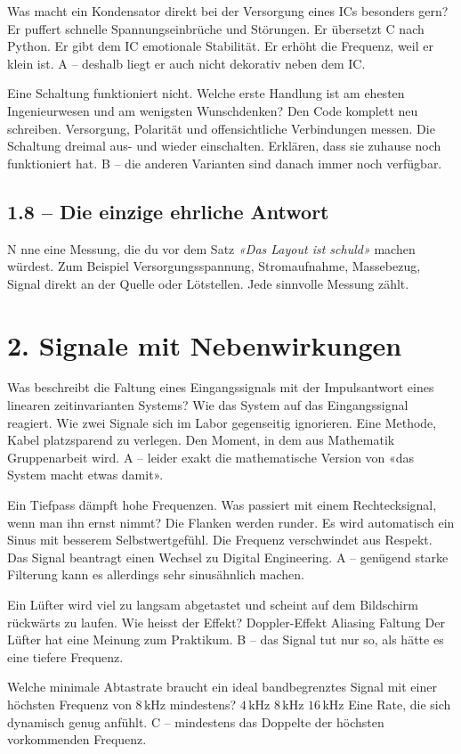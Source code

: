 \documentclass[a4paper,11pt]{article}
\newif\ifloesung
\newcommand{\loesung}[1]{%
  \ifloesung\par\smallskip{\color{zwetschge}\textit{Lösung: #1}}\par\medskip\fi}
\newcommand{\offenfrage}[3]{%
  \subsection*{#1}
  #2
  \loesung{#3}}
\newcommand{\runde}[1]{\newpage\section*{#1}\addcontentsline{toc}{section}{#1}}
\begin{document}
Was macht ein Kondensator direkt bei der Versorgung eines ICs besonders
gern?
{Er puffert schnelle Spannungseinbrüche und Störungen.}
{Er übersetzt C nach Python.}
{Er gibt dem IC emotionale Stabilität.}
{Er erhöht die Frequenz, weil er klein ist.}
{A -- deshalb liegt er auch nicht dekorativ neben dem IC.}

Eine Schaltung funktioniert nicht. Welche erste Handlung ist am ehesten
Ingenieurwesen und am wenigsten Wunschdenken?
{Den Code komplett neu schreiben.}
{Versorgung, Polarität und offensichtliche Verbindungen messen.}
{Die Schaltung dreimal aus- und wieder einschalten.}
{Erklären, dass sie zuhause noch funktioniert hat.}
{B -- die anderen Varianten sind danach immer noch verfügbar.}

\offenfrage{1.8 -- Die einzige ehrliche Antwort}
Nenne eine Messung, die du vor dem Satz \textit{«Das Layout ist schuld»}
machen würdest.
{Zum Beispiel Versorgungsspannung, Stromaufnahme, Massebezug, Signal direkt
an der Quelle oder Lötstellen. Jede sinnvolle Messung zählt.}

\runde{2. Signale mit Nebenwirkungen}

Was beschreibt die Faltung eines Eingangssignals mit der Impulsantwort
eines linearen zeitinvarianten Systems?
{Wie das System auf das Eingangssignal reagiert.}
{Wie zwei Signale sich im Labor gegenseitig ignorieren.}
{Eine Methode, Kabel platzsparend zu verlegen.}
{Den Moment, in dem aus Mathematik Gruppenarbeit wird.}
{A -- leider exakt die mathematische Version von «das System macht etwas damit».}

Ein Tiefpass dämpft hohe Frequenzen. Was passiert mit einem Rechtecksignal,
wenn man ihn ernst nimmt?
{Die Flanken werden runder.}
{Es wird automatisch ein Sinus mit besserem Selbstwertgefühl.}
{Die Frequenz verschwindet aus Respekt.}
{Das Signal beantragt einen Wechsel zu Digital Engineering.}
{A -- genügend starke Filterung kann es allerdings sehr sinusähnlich machen.}

Ein Lüfter wird viel zu langsam abgetastet und scheint auf dem Bildschirm
rückwärts zu laufen. Wie heisst der Effekt?
{Doppler-Effekt}
{Aliasing}
{Faltung}
{Der Lüfter hat eine Meinung zum Praktikum.}
{B -- das Signal tut nur so, als hätte es eine tiefere Frequenz.}

Welche minimale Abtastrate braucht ein ideal bandbegrenztes Signal mit einer
höchsten Frequenz von $8\,\mathrm{kHz}$ mindestens?
{$4\,\mathrm{kHz}$}
{$8\,\mathrm{kHz}$}
{$16\,\mathrm{kHz}$}
{Eine Rate, die sich dynamisch genug anfühlt.}
{C -- mindestens das Doppelte der höchsten vorkommenden Frequenz.}
\end{document}
